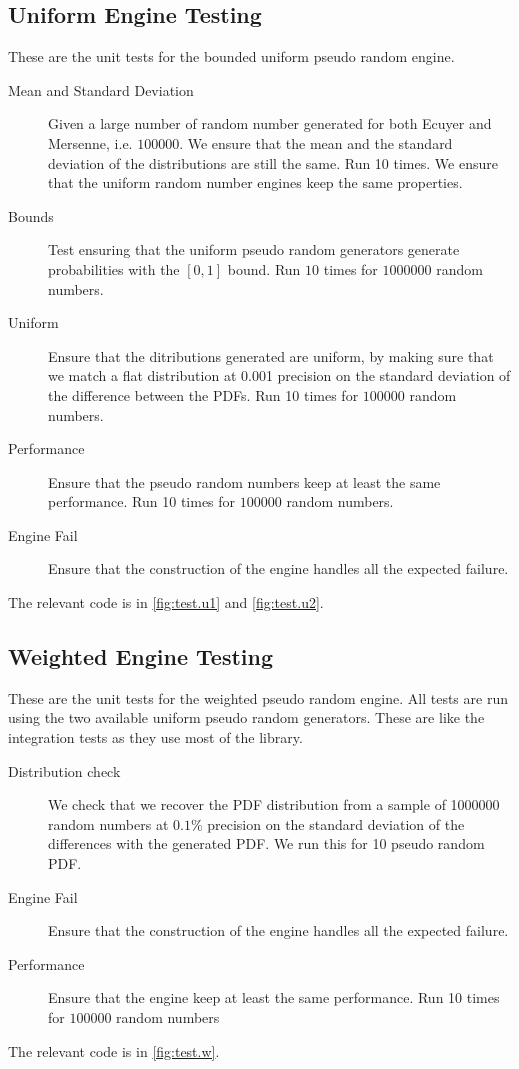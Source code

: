 \documentclass[12pt,a4paper,article]{memoir} %
\begin{document}
\subsection{Uniform Engine Testing} 

These are the unit tests for the bounded uniform pseudo random engine.
	
\begin{description}
	\item [Mean and Standard Deviation]
		Given a large number of random number generated for
		both Ecuyer and Mersenne, i.e. $100000$.
		We ensure that the mean and the standard deviation 
		of the distributions are still the same. Run 10 times.
		We ensure that the uniform random number engines keep
		the same properties.
	\item [Bounds]
		Test ensuring that the uniform pseudo random generators
		generate probabilities with the $[0, 1]$ bound.
		Run $10$ times for $1000000$ random numbers.
	\item [Uniform]
		Ensure that the ditributions generated are uniform,
		by making sure that we match a flat distribution at 0.001
		precision on the standard deviation of the difference
		between the PDFs.
		Run 10 times for $100000$ random numbers.
	\item [Performance]
		Ensure that the pseudo random numbers keep at
		least the same performance.
		Run 10 times for $100000$ random numbers.
	\item [Engine Fail]
		Ensure that the construction of the engine 
		handles all the expected failure.
\end{description}
The relevant code is in \autoref{fig:test.u1} and \autoref{fig:test.u2}.
\subsection{Weighted Engine Testing} 
These are the unit tests for the weighted pseudo random engine.
All tests are run using the two available uniform pseudo random
generators. 
These are like the integration tests as they use most of the library.
\begin{description}
	\item [Distribution check]
		We check that we recover the PDF distribution from
		a sample of 1000000 random numbers at $0.1\%$ precision
		on the standard deviation of the differences with the 
		generated PDF.
		We run this for 10 pseudo random PDF.
	\item [Engine Fail]
		Ensure that the construction of the engine 
		handles all the expected failure.
	\item [Performance]
		Ensure that the engine keep at least the same performance.
		Run 10 times for $100000$ random  numbers	
\end{description}	
The relevant code is in \autoref{fig:test.w}.
\end{document}
